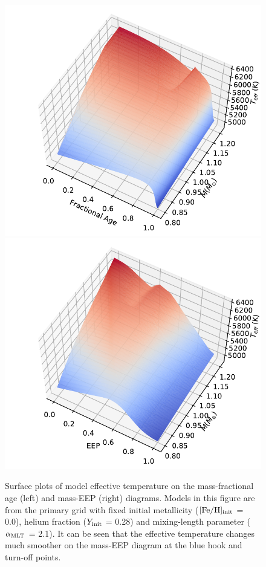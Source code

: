 \begin{figure}
        \includegraphics[width=1.\columnwidth]{2d_fage_data.pdf}
	\includegraphics[width=1.\columnwidth]{2d_EEP_data.pdf}
     \caption{Surface plots of model effective temperature on the mass-fractional age (left) and mass-EEP (right) diagrams. Models in this figure are from the primary grid with fixed initial metallicity ($\rm [Fe/H]_{init}$ = 0.0), helium fraction ($Y_{\rm init}$ = 0.28) and mixing-length parameter ($\alpha_{\rm MLT}$ = 2.1). It can be seen that the effective temperature changes much smoother on the mass-EEP diagram at the blue hook and turn-off points.}
    \label{fig:eep}
\end{figure}

